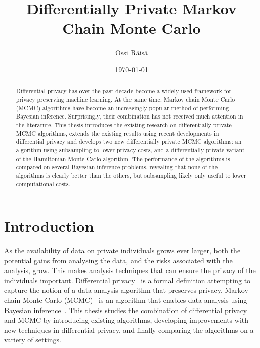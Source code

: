 \documentclass[english,twoside,openright]{HYgraduMLDS}
\title{Differentially Private Markov Chain Monte Carlo}
\author{Ossi Räisä}
\date{\today}
\begin{document}
\maketitle


\begin{abstract}
  Differential privacy has over the past decade become a widely used framework
  for privacy preserving machine learning. At the same time,
  Markov chain Monte Carlo (MCMC) algorithms have become an increasingly popular method
  of performing Bayesian inference. Surprisingly, their combination has not
  received much attention in the literature. This thesis introduces the
  existing research on differentially private MCMC algorithms, extends the
  existing results using recent developments in differential privacy and
  develops two new differentially private MCMC algorithms:
  an algorithm using subsampling to lower privacy costs, and
  a differentially private variant of the Hamiltonian Monte
  Carlo-algorithm. The performance of the algorithms is compared on several
  Bayesian inference problems, revealing that none of the algorithms is
  clearly better than the others, but subsampling likely only useful to lower
  computational costs.
\end{abstract}

\mytableofcontents

\mynomenclature

\chapter{Introduction}

As the availability of data on private individuals grows ever larger, both the
potential gains from analysing the data, and the risks associated with the
analysis, grow. This makes analysis techniques that can ensure the privacy
of the individuals important. Differential
privacy~\cite{DMN06} is a formal definition attempting to capture the notion
of a data analysis algorithm that preserves privacy. Markov chain Monte
Carlo (MCMC)~\cite{MRR53, Has70} is an algorithm that enables data analysis using
Bayesian inference~\cite{BDA}. This thesis studies the combination of
differential privacy and MCMC by introducing existing algorithms, developing
improvements with new techniques in differential privacy, and finally comparing
the algorithms on a variety of settings.
\end{document}
